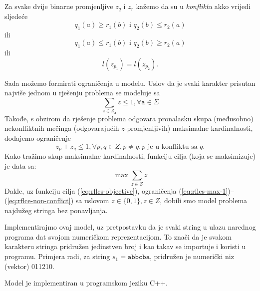 \documentclass[a4paper, utf8, 11pt, colorlinks]{book}
\theoremstyle{definition}
\begin{document}
Za svake dvije binarne promjenljive $z_{q}$ i $z_{r}$ kažemo da su u \emph{konfliktu} akko vrijedi sljedeće
 $$ q_1(a) \geq r_1(b) \mbox{ i } q_2(b) \leq r_2(a) $$ 
ili 
 $$ q_1(a) \leq r_1(b) \mbox{ i } q_2(b) \geq r_2(a)$$ 
ili 
$$ l(z_{p_1}) = l(z_{p_2}).$$

Sada možemo formirati ograničenja u modelu. Uslov da je svaki karakter prisutan najviše jednom u rješenju problema se modeluje sa 
\begin{equation}\label{eq:rflcs-max-1}
	 \sum_{z \in  Z_{\texttt{a} }} z \leq 1, \forall \texttt{a} \in \Sigma 
\end{equation}
Takođe, s obzirom da rješenje problema odgovara pronalasku skupa (međusobno) nekonfliktnih mečinga (odgovarajućih $z$-promjenljivih) maksimalne kardinalnosti, dodajemo ograničenje
\begin{equation}\label{eq:rflce-non-conflict}
	 z_{p} + z_q \leq 1, \forall p,q \in Z, p\neq q, p\mbox{ je u konfliktu sa } q.
\end{equation}
Kako tražimo skup maksimalne kardinalnosti, funkciju cilja (koja se maksimizuje) je data sa:
\begin{equation}\label{eq:rflcs-objective}
	 \max \sum_{z \in Z } z 
\end{equation}
Dakle, uz funkciju cilja (\ref{eq:rflcs-objective}), ograničenja (\ref{eq:rflcs-max-1})--(\ref{eq:rflce-non-conflict}) sa uslovom $z \in \{0, 1\}, z \in Z$, dobili smo model problema najdužeg stringa bez ponavljanja. 

 Implementirajmo ovaj model, uz pretpostavku da je svaki string u ulazu narednog programa dat svojom numeričkom reprezentacijom. To znači da je svakom karakteru stringa pridružen jedinstven broj i kao takav se importuje i koristi u programu. Primjera radi, za string $s_1=\texttt{abbcba}$, pridružen je numerički niz (vektor) 011210.
 
 Model je implementiran u programskom jeziku C++. %
 
\end{document}
